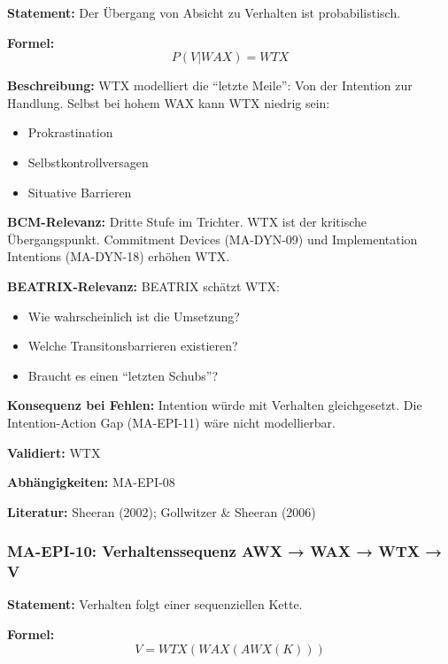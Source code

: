 \textbf{Statement:} Der Übergang von Absicht zu Verhalten ist probabilistisch.

\textbf{Formel:}
\begin{equation}
P(V|WAX) = WTX
\end{equation}

\textbf{Beschreibung:}
WTX modelliert die ``letzte Meile'': Von der Intention zur Handlung. Selbst bei hohem WAX kann WTX niedrig sein:
\begin{itemize}
    \item Prokrastination
    \item Selbstkontrollversagen
    \item Situative Barrieren
\end{itemize}

\textbf{BCM-Relevanz:}
Dritte Stufe im Trichter. WTX ist der kritische Übergangspunkt. Commitment Devices (MA-DYN-09) und Implementation Intentions (MA-DYN-18) erhöhen WTX.

\textbf{BEATRIX-Relevanz:}
BEATRIX schätzt WTX:
\begin{itemize}
    \item Wie wahrscheinlich ist die Umsetzung?
    \item Welche Transitonsbarrieren existieren?
    \item Braucht es einen ``letzten Schubs''?
\end{itemize}

\textbf{Konsequenz bei Fehlen:}
Intention würde mit Verhalten gleichgesetzt. Die Intention-Action Gap (MA-EPI-11) wäre nicht modellierbar.

\textbf{Validiert:} WTX

\textbf{Abhängigkeiten:} MA-EPI-08

\textbf{Literatur:} Sheeran (2002); Gollwitzer \& Sheeran (2006)


\subsubsection*{MA-EPI-10: Verhaltenssequenz AWX → WAX → WTX → V}

\textbf{Statement:} Verhalten folgt einer sequenziellen Kette.

\textbf{Formel:}
\begin{equation}
V = WTX(WAX(AWX(K)))
\end{equation}

